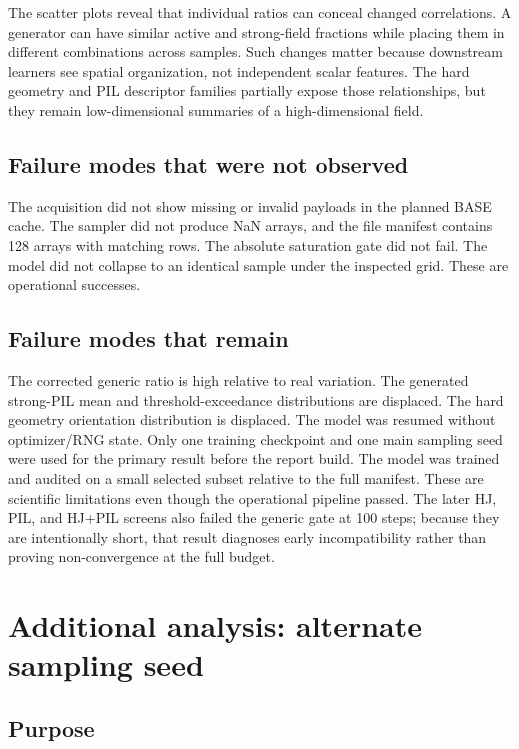 \documentclass[11pt,oneside]{report}
\begin{document}
The scatter plots reveal that individual ratios can conceal changed correlations. A generator can have similar active and strong-field fractions while placing them in different combinations across samples. Such changes matter because downstream learners see spatial organization, not independent scalar features. The hard geometry and PIL descriptor families partially expose those relationships, but they remain low-dimensional summaries of a high-dimensional field.

\section{Failure modes that were not observed}

The acquisition did not show missing or invalid payloads in the planned BASE cache. The sampler did not produce NaN arrays, and the file manifest contains 128 arrays with matching rows. The absolute saturation gate did not fail. The model did not collapse to an identical sample under the inspected grid. These are operational successes.

\section{Failure modes that remain}

The corrected generic ratio is high relative to real variation. The generated strong-PIL mean and threshold-exceedance distributions are displaced. The hard geometry orientation distribution is displaced. The model was resumed without optimizer/RNG state. Only one training checkpoint and one main sampling seed were used for the primary result before the report build. The model was trained and audited on a small selected subset relative to the full manifest. These are scientific limitations even though the operational pipeline passed. The later HJ, PIL, and HJ+PIL screens also failed the generic gate at 100 steps; because they are intentionally short, that result diagnoses early incompatibility rather than proving non-convergence at the full budget.

\chapter{Additional analysis: alternate sampling seed}

\section{Purpose}
\end{document}
